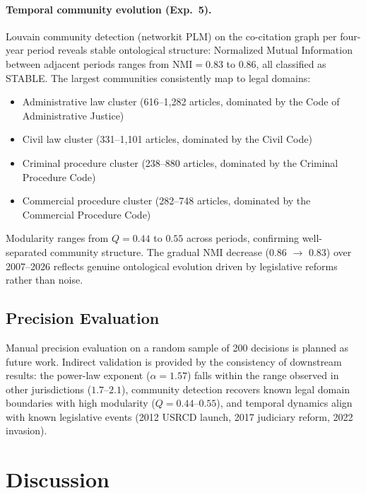 \documentclass[11pt]{article}
\begin{document}
\paragraph{Temporal community evolution (Exp.~5).}
Louvain community detection (networkit PLM) on the co-citation graph per four-year period reveals stable ontological structure: Normalized Mutual Information between adjacent periods ranges from $\text{NMI} = 0.83$ to $0.86$, all classified as STABLE.
The largest communities consistently map to legal domains:
\begin{itemize}[leftmargin=*, nosep]
  \item Administrative law cluster (616--1,282 articles, dominated by the Code of Administrative Justice)
  \item Civil law cluster (331--1,101 articles, dominated by the Civil Code)
  \item Criminal procedure cluster (238--880 articles, dominated by the Criminal Procedure Code)
  \item Commercial procedure cluster (282--748 articles, dominated by the Commercial Procedure Code)
\end{itemize}
Modularity ranges from $Q = 0.44$ to $0.55$ across periods, confirming well-separated community structure.
The gradual NMI decrease (0.86 $\to$ 0.83) over 2007--2026 reflects genuine ontological evolution driven by legislative reforms rather than noise.

\subsection{Precision Evaluation}
\label{sec:precision}

Manual precision evaluation on a random sample of 200 decisions is planned as future work.
Indirect validation is provided by the consistency of downstream results: the power-law exponent ($\alpha = 1.57$) falls within the range observed in other jurisdictions ($1.7$--$2.1$), community detection recovers known legal domain boundaries with high modularity ($Q = 0.44$--$0.55$), and temporal dynamics align with known legislative events (2012 USRCD launch, 2017 judiciary reform, 2022 invasion).


\section{Discussion}
\label{sec:discussion}
\end{document}
